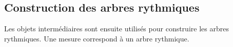 \subsection{Construction des arbres rythmiques}

Les objets intermédiaires sont ensuite utilisés pour construire les arbres rythmiques. Une mesure correspond à un arbre rythmique.




